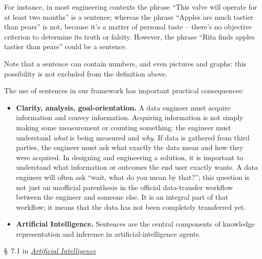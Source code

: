 \documentclass[
  a4paper,
  DIV=11,
  numbers=noendperiod,
  oneside]{scrreprt}
\begin{document}
For instance, in most engineering contexts the phrase ``This valve will
operate for at least two months'' is a sentence; whereas the phrase
``Apples are much tastier than pears'' is not, because it's a matter of
personal taste -- there's no objective criterion to determine its truth
or falsity. However, the phrase ``Rita finds apples tastier than pears''
could be a sentence.

Note that a sentence can contain numbers, and even pictures and graphs:
this possibility is not excluded from the definition above.

The use of sentences in our framework has important practical
consequences:

\begin{itemize}
\item
  \textbf{Clarity, analysis, goal-orientation.} A data engineer must
  acquire information and convey information. Acquiring information is
  not simply making some measurement or counting something: the engineer
  must understand \emph{what} is being measured and \emph{why}. If data
  is gathered from third parties, the engineer must ask what exactly the
  data mean and how they were acquired. In designing and engineering a
  solution, it is important to understand what information or outcomes
  the end user exactly wants. A data engineer will often ask ``wait,
  what do you mean by that?''; this question is not just an unofficial
  parenthesis in the official data-transfer workflow between the
  engineer and someone else. It is an integral part of that workflow; it
  means that the data has not been completely transferred yet.
\item
  \textbf{Artificial Intelligence.} Sentences are the central components
  of knowledge representation and inference in artificial-intelligence
  agents.
\end{itemize}

\begin{tcolorbox}[enhanced jigsaw, arc=.35mm, colback=white, bottomrule=.15mm, bottomtitle=1mm, breakable, opacityback=0, toptitle=1mm, toprule=.15mm, rightrule=.15mm, colframe=quarto-callout-caution-color-frame, leftrule=.75mm, left=2mm, opacitybacktitle=0.6, titlerule=0mm, colbacktitle=quarto-callout-caution-color!10!white, title={\faIcon{book-open} Reading}, coltitle=black]

§~7.1 in
\href{https://hvl.instructure.com/courses/25074/modules/items/660089}{\emph{Artificial
Intelligence}}

\end{tcolorbox}
\end{document}
